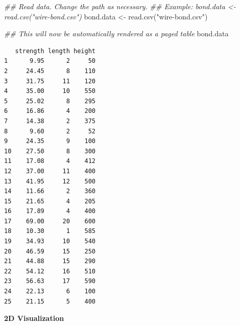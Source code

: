 \documentclass[
  letterpaper,
]{scrbook}
\newenvironment{Shaded}{\begin{snugshade}}{\end{snugshade}}
\newcommand{\DocumentationTok}[1]{\textcolor[rgb]{0.37,0.37,0.37}{\textit{#1}}}
\newcommand{\FunctionTok}[1]{\textcolor[rgb]{0.28,0.35,0.67}{#1}}
\newcommand{\NormalTok}[1]{\textcolor[rgb]{0.00,0.23,0.31}{#1}}
\newcommand{\OtherTok}[1]{\textcolor[rgb]{0.00,0.23,0.31}{#1}}
\newcommand{\StringTok}[1]{\textcolor[rgb]{0.13,0.47,0.30}{#1}}
\begin{document}
\begin{Shaded}
\begin{Highlighting}[]
\DocumentationTok{\#\# Read data. Change the path as necessary.}
\DocumentationTok{\#\# Example: bond.data \textless{}{-} read.csv("wire{-}bond.csv")}
\NormalTok{bond.data }\OtherTok{\textless{}{-}} \FunctionTok{read.csv}\NormalTok{(}\StringTok{"wire{-}bond.csv"}\NormalTok{)}

\DocumentationTok{\#\# This will now be automatically rendered as a paged table}
\NormalTok{bond.data}
\end{Highlighting}
\end{Shaded}

\begin{verbatim}
   strength length height
1      9.95      2     50
2     24.45      8    110
3     31.75     11    120
4     35.00     10    550
5     25.02      8    295
6     16.86      4    200
7     14.38      2    375
8      9.60      2     52
9     24.35      9    100
10    27.50      8    300
11    17.08      4    412
12    37.00     11    400
13    41.95     12    500
14    11.66      2    360
15    21.65      4    205
16    17.89      4    400
17    69.00     20    600
18    10.30      1    585
19    34.93     10    540
20    46.59     15    250
21    44.88     15    290
22    54.12     16    510
23    56.63     17    590
24    22.13      6    100
25    21.15      5    400
\end{verbatim}

\textbf{2D Visualization}
\end{document}
